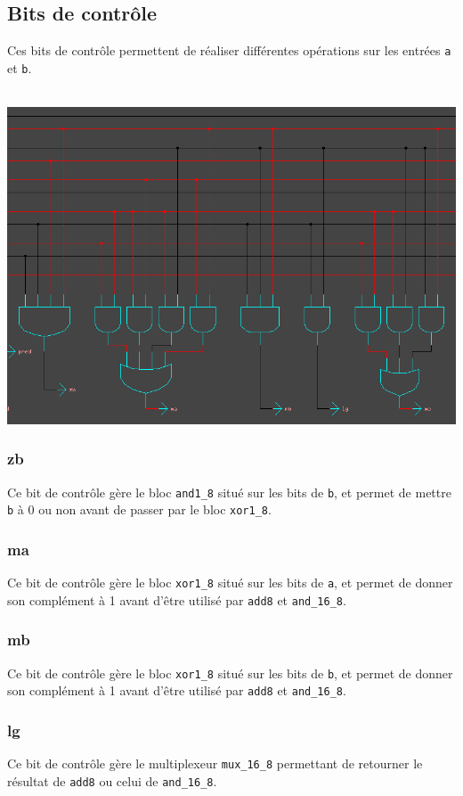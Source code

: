 \documentclass[11pt, a4paper, twoside, titlepage]{article}
\begin{document}
\newpage
\subsection{Bits de contrôle}
	Ces bits de contrôle permettent de réaliser différentes opérations sur les entrées \texttt{a} et \texttt{b}.\\
	\\
	\centerline{\includegraphics[width=0.8 \textwidth]{log_alu}}

\subsubsection{zb}
	Ce bit de contrôle gère le bloc \texttt{and1\_8} situé sur les bits de \texttt{b}, et permet de mettre \texttt{b} à 0 ou non avant de passer par le bloc \texttt{xor1\_8}.

\subsubsection{ma}
	Ce bit de contrôle gère le bloc \texttt{xor1\_8} situé sur les bits de \texttt{a}, et permet de donner son complément à 1 avant d'être utilisé par \texttt{add8} et \texttt{and\_16\_8}.

\subsubsection{mb}
	Ce bit de contrôle gère le bloc \texttt{xor1\_8} situé sur les bits de \texttt{b}, et permet de donner son complément à 1 avant d'être utilisé par \texttt{add8} et \texttt{and\_16\_8}.

\subsubsection{lg}
	Ce bit de contrôle gère le multiplexeur \texttt{mux\_16\_8} permettant de retourner le résultat de \texttt{add8} ou celui de \texttt{and\_16\_8}.
\end{document}

